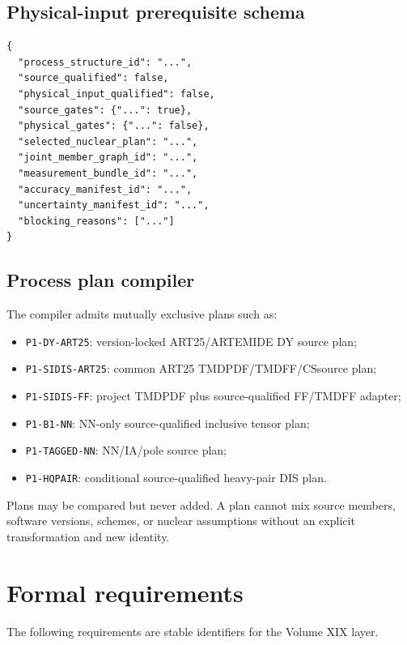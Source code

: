 \documentclass[11pt]{article}
\newcommand{\CS}{\ensuremath{\mathrm{CS}}}
\begin{document}
\subsection{Physical-input prerequisite schema}

\begin{verbatim}
{
  "process_structure_id": "...",
  "source_qualified": false,
  "physical_input_qualified": false,
  "source_gates": {"...": true},
  "physical_gates": {"...": false},
  "selected_nuclear_plan": "...",
  "joint_member_graph_id": "...",
  "measurement_bundle_id": "...",
  "accuracy_manifest_id": "...",
  "uncertainty_manifest_id": "...",
  "blocking_reasons": ["..."]
}
\end{verbatim}

\subsection{Process plan compiler}

The compiler admits mutually exclusive plans such as:
\begin{itemize}
\item \texttt{P1-DY-ART25}: version-locked ART25/ARTEMIDE DY source plan;
\item \texttt{P1-SIDIS-ART25}: common ART25 TMDPDF/TMDFF/\CS source plan;
\item \texttt{P1-SIDIS-FF}: project TMDPDF plus source-qualified FF/TMDFF adapter;
\item \texttt{P1-B1-NN}: NN-only source-qualified inclusive tensor plan;
\item \texttt{P1-TAGGED-NN}: NN/IA/pole source plan;
\item \texttt{P1-HQPAIR}: conditional source-qualified heavy-pair DIS plan.
\end{itemize}
Plans may be compared but never added.  A plan cannot mix source members, software versions, schemes, or nuclear assumptions without an explicit transformation and new identity.

\section{Formal requirements}
\label{sec:requirements}

The following requirements are stable identifiers for the Volume XIX layer.
\end{document}
